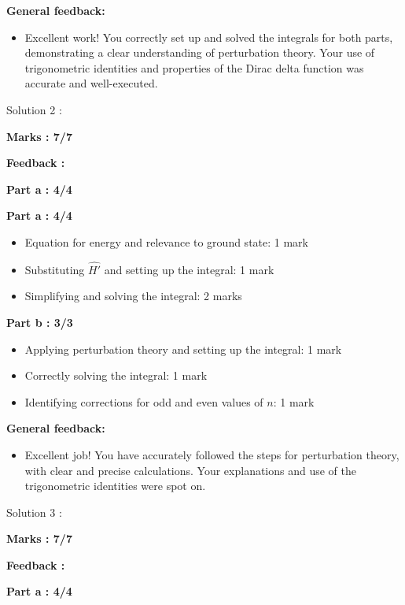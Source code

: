 \documentclass[a4paper,11pt]{article}
\begin{document}
\textbf{General feedback:}

\begin{itemize}
    \item Excellent work! You correctly set up and solved the integrals for both parts, demonstrating a clear understanding of perturbation theory. Your use of trigonometric identities and properties of the Dirac delta function was accurate and well-executed.
\end{itemize}



Solution 2 :

\textbf{Marks : 7/7}

\textbf{Feedback :}

\textbf{Part a : 4/4}

\textbf{Part a : 4/4}

\begin{itemize}
    \item Equation for energy and relevance to ground state: 1 mark
    \item Substituting $\hat{H'}$ and setting up the integral: 1 mark
    \item Simplifying and solving the integral: 2 marks
\end{itemize}


\textbf{Part b : 3/3}

\begin{itemize}
    \item Applying perturbation theory and setting up the integral: 1 mark
    \item Correctly solving the integral: 1 mark
    \item Identifying corrections for odd and even values of $n$: 1 mark
\end{itemize}

\textbf{General feedback:}

\begin{itemize}
    \item Excellent job! You have accurately followed the steps for perturbation theory, with clear and precise calculations. Your explanations and use of the trigonometric identities were spot on.
\end{itemize}



Solution 3 :

\textbf{Marks : 7/7}

\textbf{Feedback :}

\textbf{Part a : 4/4}
\end{document}
